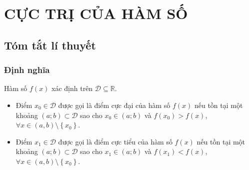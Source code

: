 \section{CỰC TRỊ CỦA HÀM SỐ}
\subsection{Tóm tắt lí thuyết}
\subsubsection{Định nghĩa}
\begin{dn}
	\normalfont	Hàm số $f\left( x \right)$ xác định trên $\mathscr{D}\subseteq \mathbb{R}$.
	
	\normalfont	\begin{itemize}
		\item[\checkmark] 	Điểm ${x_0}\in \mathscr{D}$ được gọi là điểm cực đại của hàm số $f\left( x \right)$ nếu tồn tại một khoảng $\left( a;b \right)\subset \mathscr{D}$ sao cho ${x_0}\in \left( a;b \right)$ và $f\left( {x_0} \right)>f\left( x \right)$, $\forall x\in \left( a,b \right)\setminus \left\{ {x_0} \right\}$.
		\item[\checkmark] Điểm $x_1\in \mathscr{D}$ được gọi là điểm cực tiểu của hàm số $f\left( x \right)$ nếu tồn tại một khoảng $\left( a;b \right)\subset \mathscr{D}$ sao cho $x_1\in \left( a;b \right)$ và $f\left( x_1 \right)<f\left( x \right)$, $\forall x\in \left( a,b \right)\setminus \left\{ {x_0} \right\}$.
	\end{itemize}
\end{dn}
